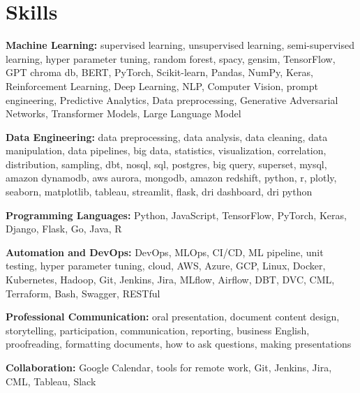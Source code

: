 \documentclass{modern} %
\begin{document}
\section{Skills}
\begin{onecolentry}
    \textbf{Machine Learning: } {supervised learning, unsupervised learning, semi{-}supervised learning, hyper parameter tuning, random forest, spacy, gensim, TensorFlow, GPT chroma db, BERT, PyTorch, Scikit{-}learn, Pandas, NumPy, Keras, Reinforcement Learning, Deep Learning, NLP, Computer Vision, prompt engineering, Predictive Analytics, Data preprocessing, Generative Adversarial Networks, Transformer Models, Large Language Model}
\end{onecolentry}
\vspace{0.2 cm}
\begin{onecolentry}
    \textbf{Data Engineering: } {data preprocessing, data analysis, data cleaning, data manipulation, data pipelines, big data, statistics, visualization, correlation, distribution, sampling, dbt, nosql, sql, postgres, big query, superset, mysql, amazon dynamodb, aws aurora, mongodb, amazon redshift, python, r, plotly, seaborn, matplotlib, tableau, streamlit, flask, dri dashboard, dri python}
\end{onecolentry}
\vspace{0.2 cm}
\begin{onecolentry}
    \textbf{Programming Languages: } {Python, JavaScript, TensorFlow, PyTorch, Keras, Django, Flask, Go, Java, R}
\end{onecolentry}
\vspace{0.2 cm}
\begin{onecolentry}
    \textbf{Automation and DevOps: } {DevOps, MLOps, CI/CD, ML pipeline, unit testing, hyper parameter tuning, cloud, AWS, Azure, GCP, Linux, Docker, Kubernetes, Hadoop, Git, Jenkins, Jira, MLflow, Airflow, DBT, DVC, CML, Terraform, Bash, Swagger, RESTful}
\end{onecolentry}
\vspace{0.2 cm}
\begin{onecolentry}
    \textbf{Professional Communication: } {oral presentation, document content design, storytelling, participation, communication, reporting, business English, proofreading, formatting documents, how to ask questions, making presentations}
\end{onecolentry}
\vspace{0.2 cm}
\begin{onecolentry}
    \textbf{Collaboration: } {Google Calendar, tools for remote work, Git, Jenkins, Jira, CML, Tableau, Slack}
\end{onecolentry}
\vspace{0.2 cm}











\end{document}
